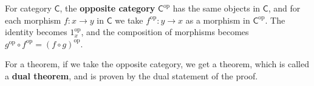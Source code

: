 \begin{defn} For category $\mathsf{C}$, the \textbf{opposite category} $\mathsf{C}^{\mathrm{op}}$ has the same objects in $\mathsf{C}$, and for each morphism $f:x\rightarrow y$ in $\mathsf{C}$ we take $f^{\mathrm{op}}:y\rightarrow x$ as a morphism in $\mathsf{C}^{\mathrm{op}}$. The identity becomes $1_x^{\mathrm{op}}$, and the composition of morphisms becomes $g^{\mathrm{op}}\circ f^{\mathrm{op}}=(f\circ g)^{\mathrm{op}}$.
\end{defn}

\begin{defn} For a theorem, if we take the opposite category, we get a theorem, which is called a \textbf{dual theorem}, and is proven by the dual statement of the proof.
\end{defn}

